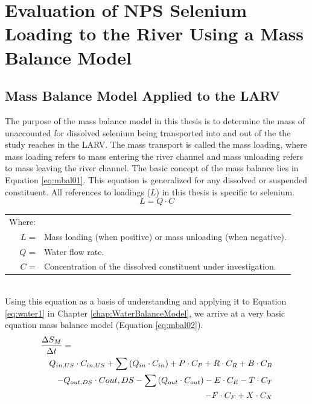\renewcommand{\thechapter}{5}
\chapter{Evaluation of NPS Selenium Loading to the River Using a Mass Balance Model}
\label{chap:MassBalanceModel}

\begin{linenumbers}
\section{Mass Balance Model Applied to the LARV}
\label{sec:AppliedMassModel}

The purpose of the mass balance model in this thesis is to determine the mass of unaccounted for dissolved selenium being transported into and out of the the study reaches in the LARV.  The mass transport is called the mass loading, where mass loading refers to mass entering the river channel and mass unloading refers to mass leaving the river channel.  The basic concept of the mass balance lies in Equation \ref{eq:mbal01}.  This equation is generalized for any dissolved or suspended constituent.  All references to loadings ($ L $) in this thesis is specific to selenium.
\begin{equation}
	\label{eq:mbal01}
	L=Q \cdot C
\end{equation}
\begin{tabular}{r p{5.5in}}
		Where:  \\
		$ L $ = & Mass loading (when positive) or mass unloading (when negative).\\
		$ Q $ = & Water flow rate.\\
		$ C $ = & Concentration of the dissolved constituent under investigation.\\
\end{tabular}\\

Using this equation as a basis of understanding and applying it to Equation \ref{eq:water1} in Chapter \ref{chap:WaterBalanceModel}, we arrive at a very basic equation mass balance model (Equation \ref{eq:mbal02}).
\begin{eqnarray}
	\label{eq:mbal02}
	\lefteqn{\frac{\Delta S_M}{\Delta t}=} \\
	\nonumber & &  Q_{in,US} \cdot C_{in,US} + \sum \left( Q_{in} \cdot C_{in} \right) + P \cdot C_P + R \cdot C_R  + B \cdot C_B\\
	\nonumber & & - Q_{out,DS} \cdot C{out,DS} - \sum \left( Q_{out} \cdot C_{out} \right) - E \cdot C_E - T \cdot C_T \\
	\nonumber & & - F \cdot C_F + X \cdot C_X
\end{eqnarray}\\


\end{linenumbers}
